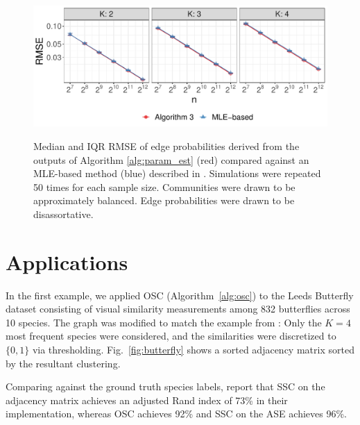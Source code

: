 \documentclass[12pt]{article}
\begin{document}
\begin{figure}[H]
{\centering \includegraphics{summary_files/figure-latex/lambda_est_disassortative}
}
\caption{Median and IQR RMSE of edge probabilities derived from the
  outputs of Algorithm \ref{alg:param_est} (red) compared against an
  MLE-based method (blue) described in
  \cite{307cbeb9b1be48299388437423d94bf1}.
  Simulations were repeated 50 times for each sample size. 
  Communities were drawn to be approximately balanced.
  Edge probabilities were drawn to be disassortative.}
\label{fig:lambda_est_disassortative}
\end{figure}

\hypertarget{real-data-examples}{%
\section{Applications}\label{real-data-examples}}

In the first example, we applied OSC (Algorithm~\ref{alg:osc}) to the Leeds Butterfly
dataset \citep{Wang_2018} consisting of visual similarity measurements
among 832 butterflies across 10 species. The graph was modified to match
the example from \citet{noroozi2019estimation}: Only the $K=4$ most
frequent species were considered, and the similarities were discretized
to \(\{0, 1\}\) via thresholding. Fig.~\ref{fig:butterfly} shows a
sorted adjacency matrix sorted by the resultant clustering.

Comparing against the ground truth species labels, \citet{noroozi2019estimation} 
report that SSC on the adjacency matrix achieves an adjusted Rand index of 73\% in their implementation, 
whereas OSC achieves 92\% and SSC on the ASE achieves 96\%. 
\end{document}
